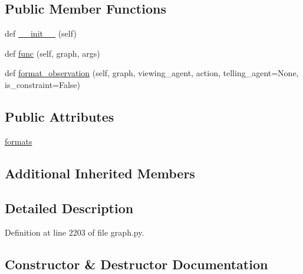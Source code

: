 \subsection*{Public Member Functions}
\begin{DoxyCompactItemize}
\item 
def \hyperlink{classlight__chats_1_1graph_1_1LookFunction_a2b2692f97a52251a450c60d10a80f37e}{\+\_\+\+\_\+init\+\_\+\+\_\+} (self)
\item 
def \hyperlink{classlight__chats_1_1graph_1_1LookFunction_aeaedd1fa680a930dc86a1120d9daf63d}{func} (self, graph, args)
\item 
def \hyperlink{classlight__chats_1_1graph_1_1LookFunction_a7723e1da8ce79443c49fd4a5f6dce978}{format\+\_\+observation} (self, graph, viewing\+\_\+agent, action, telling\+\_\+agent=None, is\+\_\+constraint=False)
\end{DoxyCompactItemize}
\subsection*{Public Attributes}
\begin{DoxyCompactItemize}
\item 
\hyperlink{classlight__chats_1_1graph_1_1LookFunction_a98ca1312bcaf009a34ee3e1b1b43a3d6}{formats}
\end{DoxyCompactItemize}
\subsection*{Additional Inherited Members}


\subsection{Detailed Description}


Definition at line 2203 of file graph.\+py.



\subsection{Constructor \& Destructor Documentation}
\mbox{\label{classlight__chats_1_1graph_1_1LookFunction_a2b2692f97a52251a450c60d10a80f37e}} 

